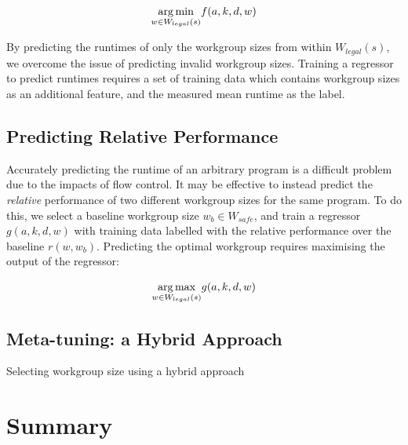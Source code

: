\begin{equation}
  \underset{w \in W_{legal}(s)}{\operatorname*{arg\,min}} f(a,k,d,w)
\end{equation}

By predicting the runtimes of only the workgroup sizes from within
$W_{legal}(s)$, we overcome the issue of predicting invalid workgroup
sizes. Training a regressor to predict runtimes requires a set of
training data which contains workgroup sizes as an additional feature,
and the measured mean runtime as the label.

% 

\subsection{Predicting Relative Performance}

Accurately predicting the runtime of an arbitrary program is a
difficult problem due to the impacts of flow control. It may be
effective to instead predict the \emph{relative} performance of two
different workgroup sizes for the same program. To do this, we select
a baseline workgroup size $w_b \in W_{safe}$, and train a regressor
$g(a,k,d,w)$ with training data labelled with the relative performance
over the baseline $r(w, w_b)$. Predicting the optimal workgroup
requires maximising the output of the regressor:

\begin{equation}
  \underset{w \in W_{legal}(s)}{\operatorname*{arg\,max}} g(a,k,d,w)
\end{equation}

% 


\subsection{Meta-tuning: a Hybrid Approach}


\begin{algorithm}

\caption{Selecting workgroup size using a hybrid approach}
\label{alg:autotune-hybrid}
\end{algorithm}


\section{Summary}
